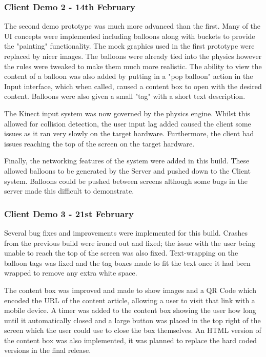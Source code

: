 \subsubsection{Client Demo 2 - 14th February}
The second demo prototype was much more advanced than the first. Many of the UI
concepts were implemented including balloons along with buckets to provide the 
"painting" functionality. The mock graphics used in the first prototype were 
replaced by nicer images. The balloons were already tied into the physics 
however the rules were tweaked to make them much more realistic. The ability to
view the content of a balloon was also added by putting in a "pop balloon" 
action in the Input interface, which when called, caused a content box to open
with the desired content. Balloons were also given a small "tag" with a short
text description.

The Kinect input system was now governed by the physics engine. Whilst this 
allowed for collision detection, the user input lag added caused the client 
some issues as it ran very slowly on the target hardware. Furthermore, the
client had issues reaching the top of the screen on the target hardware.

Finally, the networking features of the system were added in this build. These
allowed balloons to be generated by the Server and pushed down to the Client 
system. Balloons could be pushed between screens although some bugs in the 
server made this difficult to demonstrate.

\subsubsection{Client Demo 3 - 21st February}
Several bug fixes and improvements were implemented for this build. Crashes 
from the previous build were ironed out and fixed; the issue with the user 
being unable to reach the top of the screen was also fixed. Text-wrapping on 
the balloon tags was fixed and the tag boxes made to fit the text once it had
been wrapped to remove any extra white space.

The content box was improved and made to show images and a QR Code which 
encoded the URL of the content article, allowing a user to visit that link with
a mobile device. A timer was added to the content box showing the user how long
until it automatically closed and a large button was placed in the top right of
the screen which the user could use to close the box themselves. An HTML 
version of the content box was also implemented, it was planned to replace the
hard coded versions in the final release. 

